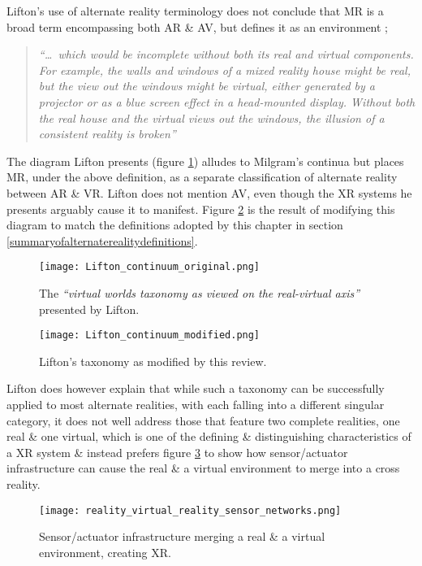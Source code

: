 Lifton's use of alternate reality terminology does not conclude that MR is a broad term encompassing both AR \& AV, but defines it as an environment ;

\begin{quote}
	\textit{``\ldots\ which would be incomplete without both its real and virtual components. For example, the walls and windows of a mixed reality house might be real, but the view out the windows might be virtual, either generated by a projector or as a blue screen effect in a head-mounted display. Without both the real house and the virtual views out the windows, the illusion of a consistent reality is broken''}~\cite{Lifton2007a}
\end{quote}

The diagram Lifton presents (figure \ref{original_lifton_axis.png}) alludes to Milgram's continua but places MR, under the above definition, as a separate classification of alternate reality between AR \& VR. Lifton does not mention AV, even though the XR systems he presents arguably cause it to manifest. Figure \ref{modified_lifton_axis.png} is the result of modifying this diagram to match the definitions adopted by this chapter in section \ref{summaryofalternaterealitydefinitions}.

\begin{figure}[h]
	\centering
	\texttt{[image: Lifton\_continuum\_original.png]}
	\caption{The \textit{``virtual worlds taxonomy as viewed on the real-virtual axis''} presented by Lifton.}
	\label{original_lifton_axis.png}
\end{figure}

\begin{figure}[h]
	\centering
	\texttt{[image: Lifton\_continuum\_modified.png]}
	\caption{Lifton's taxonomy as modified by this review.}
	\label{modified_lifton_axis.png}
\end{figure}

Lifton does however explain that while such a taxonomy can be successfully applied to most alternate realities, with each falling into a different singular category, it does not well address those that feature two complete realities, one real \& one virtual, which is one of the defining \& distinguishing characteristics of a XR system \& instead prefers figure \ref{reality_virtual_reality_sensor_networks.png} to show how sensor/actuator infrastructure can cause the real \& a virtual environment to merge into a cross reality.

\begin{figure}[h]
	\centering
	\texttt{[image: reality\_virtual\_reality\_sensor\_networks.png]}
	\caption{Sensor/actuator infrastructure merging a real \& a virtual environment, creating XR.}
	\label{reality_virtual_reality_sensor_networks.png}
\end{figure}

